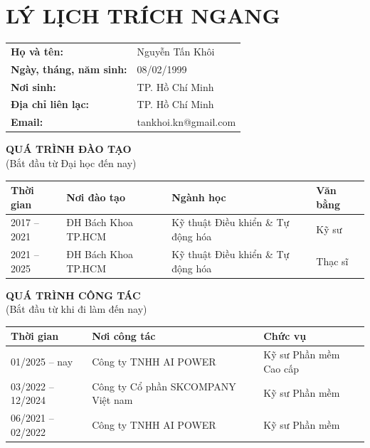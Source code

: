 

\chapter*{LÝ LỊCH TRÍCH NGANG}

{\fontsize{13}{15}\selectfont

\noindent
\begin{tabular}{@{}p{5cm}p{9cm}@{}}
\textbf{Họ và tên:} & Nguyễn Tấn Khôi\\[0.3cm]
\textbf{Ngày, tháng, năm sinh:} & 08/02/1999\\[0.3cm]
\textbf{Nơi sinh:} & TP. Hồ Chí Minh\\[0.3cm]
\textbf{Địa chỉ liên lạc:} & TP. Hồ Chí Minh\\[0.3cm]
\textbf{Email:} & tankhoi.kn@gmail.com\\
\end{tabular}

\vspace{1cm}

\textbf{QUÁ TRÌNH ĐÀO TẠO}\\
(Bắt đầu từ Đại học đến nay)

\vspace{0.5cm}

\begin{tabular}{|p{2.5cm}|p{3.8cm}|p{4cm}|p{2.5cm}|}
\hline
\textbf{Thời gian} & \textbf{Nơi đào tạo} & \textbf{Ngành học} & \textbf{Văn bằng}\\
\hline
2017 -- 2021 & ĐH Bách Khoa TP.HCM & Kỹ thuật Điều khiển \& Tự động hóa & Kỹ sư\\
\hline
2021 -- 2025 & ĐH Bách Khoa TP.HCM & Kỹ thuật Điều khiển \& Tự động hóa & Thạc sĩ\\
\hline
\end{tabular}

\vspace{1cm}

\textbf{QUÁ TRÌNH CÔNG TÁC}\\
(Bắt đầu từ khi đi làm đến nay)

\vspace{0.5cm}

\begin{tabular}{|p{2.5cm}|p{6cm}|p{4cm}|}
\hline
\textbf{Thời gian} & \textbf{Nơi công tác} & \textbf{Chức vụ}\\
\hline
01/2025 -- nay & Công ty TNHH AI POWER & Kỹ sư Phần mềm Cao cấp\\
\hline
03/2022 -- 12/2024 & Công ty Cổ phần SKCOMPANY Việt nam & Kỹ sư Phần mềm\\
\hline
06/2021 -- 02/2022 & Công ty TNHH AI POWER & Kỹ sư Phần mềm\\
\hline
\end{tabular}

}
